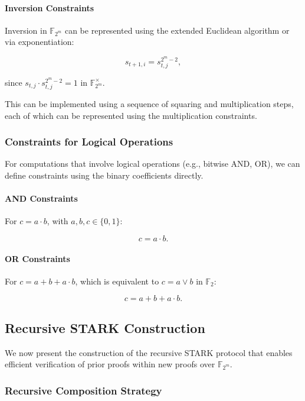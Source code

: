 \documentclass{article}
\theoremstyle{plain}
\theoremstyle{definition}
\theoremstyle{remark}
\theoremstyle{problem}
\begin{document}
\paragraph{Inversion Constraints}

Inversion in $\mathbb{F}_{2^m}$ can be represented using the extended Euclidean algorithm or via exponentiation:

\[
s_{t+1,i} = s_{t,j}^{2^m - 2},
\]

since $s_{t,j} \cdot s_{t,j}^{2^m - 2} = 1$ in $\mathbb{F}_{2^m}^\times$.

This can be implemented using a sequence of squaring and multiplication steps, each of which can be represented using the multiplication constraints.

\subsubsection{Constraints for Logical Operations}

For computations that involve logical operations (e.g., bitwise AND, OR), we can define constraints using the binary coefficients directly.

\paragraph{AND Constraints}

For $c = a \cdot b$, with $a, b, c \in \{0,1\}$:

\[
c = a \cdot b.
\]

\paragraph{OR Constraints}

For $c = a + b + a \cdot b$, which is equivalent to $c = a \lor b$ in $\mathbb{F}_2$:

\[
c = a + b + a \cdot b.
\]

\subsection{Recursive STARK Construction}

We now present the construction of the recursive STARK protocol that enables efficient verification of prior proofs within new proofs over $\mathbb{F}_{2^m}$.

\subsubsection{Recursive Composition Strategy}
\end{document}
